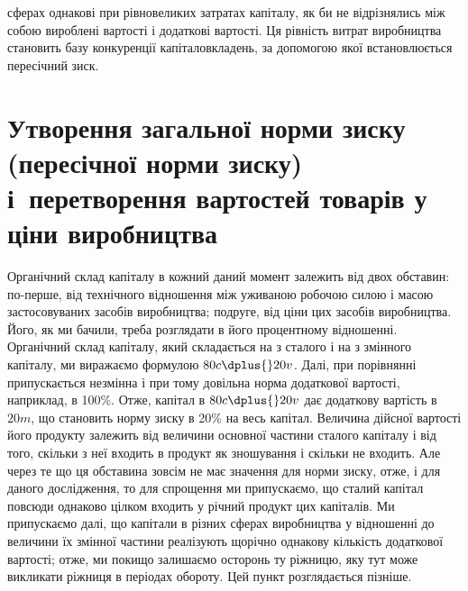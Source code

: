 \parcont{}  %
сферах однакові при рівновеликих затратах капіталу, як би не
відрізнялись між собою вироблені вартості і додаткові вартості.
Ця рівність витрат виробництва становить базу конкуренції капіталовкладень, за допомогою якої
встановлюється пересічний зиск.

\section{%
Утворення загальної норми зиску (пересічної норми зиску)
і~перетворення вартостей товарів у ціни виробництва}
%

Органічний склад капіталу в кожний даний момент залежить
від двох обставин: по-перше, від технічного відношення між уживаною робочою силою і масою
застосовуваних засобів виробництва; подруге, від ціни цих засобів виробництва. Його, як ми бачили,
треба розглядати в його процентному відношенні. Органічний склад капіталу, який складається на  з
сталого і на  з змінного капіталу, ми виражаємо формулою $80 c \dplus{} 20 v$. Далі, при
порівнянні припускається незмінна і при тому довільна норма
додаткової вартості, наприклад, в 100\%. Отже, капітал в $80 c \dplus{} 20 v$ дає додаткову вартість в $20 m$,
що становить норму зиску
в 20\% на весь капітал. Величина дійсної вартості його продукту
залежить від величини основної частини сталого капіталу і від
того, скільки з неї входить в продукт як зношування і скільки
не входить. Але через те що ця обставина зовсім не має значення для норми зиску, отже, і для даного
дослідження, то для
спрощення ми припускаємо, що сталий капітал повсюди однаково цілком входить у річний продукт цих
капіталів. Ми припускаємо далі, що капітали в різних сферах виробництва у
відношенні до величини їх змінної частини реалізують щорічно
однакову кількість додаткової вартості; отже, ми покищо залишаємо осторонь ту ріжницю, яку тут може
викликати ріжниця
в періодах обороту. Цей пункт розглядається пізніше.

